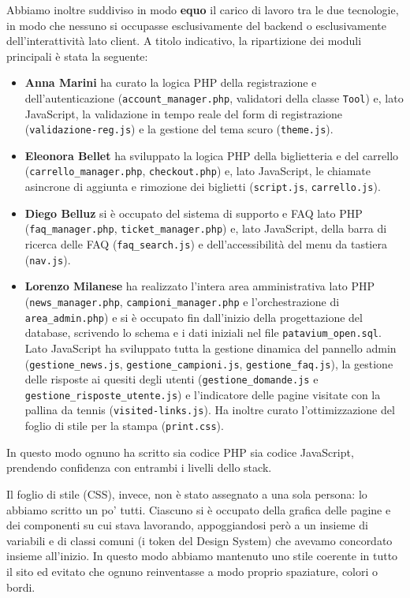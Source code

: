 \documentclass[11pt,a4paper]{article}
\begin{document}
Abbiamo inoltre suddiviso in modo \textbf{equo} il carico di lavoro tra le due tecnologie, in modo che nessuno si occupasse esclusivamente del backend o esclusivamente dell'interattività lato client. A titolo indicativo, la ripartizione dei moduli principali è stata la seguente:
\begin{itemize}
    \item \textbf{Anna Marini} ha curato la logica PHP della registrazione e dell'autenticazione (\texttt{account\_manager.php}, validatori della classe \texttt{Tool}) e, lato JavaScript, la validazione in tempo reale del form di registrazione (\texttt{validazione-reg.js}) e la gestione del tema scuro (\texttt{theme.js}).
    \item \textbf{Eleonora Bellet} ha sviluppato la logica PHP della biglietteria e del carrello (\texttt{carrello\_manager.php}, \texttt{checkout.php}) e, lato JavaScript, le chiamate asincrone di aggiunta e rimozione dei biglietti (\texttt{script.js}, \texttt{carrello.js}).
    \item \textbf{Diego Belluz} si è occupato del sistema di supporto e FAQ lato PHP (\texttt{faq\_manager.php}, \texttt{ticket\_manager.php}) e, lato JavaScript, della barra di ricerca delle FAQ (\texttt{faq\_search.js}) e dell'accessibilità del menu da tastiera (\texttt{nav.js}).
    \item \textbf{Lorenzo Milanese} ha realizzato l'intera area amministrativa lato PHP (\texttt{news\_manager.php}, \texttt{campioni\_manager.php} e l'orchestrazione di \texttt{area\_admin.php}) e si è occupato fin dall'inizio della progettazione del database, scrivendo lo schema e i dati iniziali nel file \texttt{patavium\_open.sql}. Lato JavaScript ha sviluppato tutta la gestione dinamica del pannello admin (\texttt{gestione\_news.js}, \texttt{gestione\_campioni.js}, \texttt{gestione\_faq.js}), la gestione delle risposte ai quesiti degli utenti (\texttt{gestione\_domande.js} e \texttt{gestione\_risposte\_utente.js}) e l'indicatore delle pagine visitate con la pallina da tennis (\texttt{visited-links.js}). Ha inoltre curato l'ottimizzazione del foglio di stile per la stampa (\texttt{print.css}).
\end{itemize}
In questo modo ognuno ha scritto sia codice PHP sia codice JavaScript, prendendo confidenza con entrambi i livelli dello stack.

Il foglio di stile (CSS), invece, non è stato assegnato a una sola persona: lo abbiamo scritto un po' tutti. Ciascuno si è occupato della grafica delle pagine e dei componenti su cui stava lavorando, appoggiandosi però a un insieme di variabili e di classi comuni (i token del Design System) che avevamo concordato insieme all'inizio. In questo modo abbiamo mantenuto uno stile coerente in tutto il sito ed evitato che ognuno reinventasse a modo proprio spaziature, colori o bordi.
\end{document}

